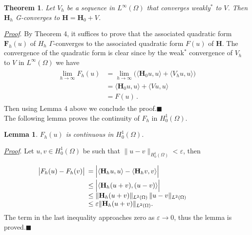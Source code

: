 \documentclass[11pt, epsf]{amsart}
\newtheorem{Theo}{Theorem}
\newtheorem{Lem}{Lemma}
\begin{document}
\begin{Theo}
\emph{
Let $V_h$ be a sequence in $L^\infty(\Omega)$ that converges weakly$^\ast$ to $V$. Then $\mathbf{H}_h$ G-converges to $\mathbf{H}=\mathbf{H}_0+V$.
}
\end{Theo}
\hspace{-4mm}\underline{\emph{Proof}}. By Theorem 4, it suffices to prove that the associated quadratic form $\mathbf{F}_h(u)$ of $H_h$ $\Gamma$-converges to the associated quadratic form $F(u)$ of $\mathbf{H}$. The convergence of the quadratic form is clear since by the weak$^\ast$ convergence of $V_h$ to $V$ in $L^\infty(\Omega)$ we have
\begin{eqnarray*}
\begin{array}{ll}
\displaystyle\lim_{h\to\infty}F_h(u)&\!\!\!=\displaystyle\lim_{h\to\infty} \Big(\langle \mathbf{H}_0u,u\rangle+\langle V_hu,u\rangle\Big)\\
&\!\!\!=\displaystyle\langle \mathbf{H}_0u,u\rangle+\langle Vu,u\rangle\\
&\!\!\!=F(u)\,.
\end{array}
\end{eqnarray*}
Then using Lemma 4 above we conclude the proof.\hfill{$\blacksquare$}\\

The following lemma proves the continuity of $F_h$ in $ H^1_0(\Omega)$.
\begin{Lem}
\emph{
$F_h(u)$ is continuous in $H^1_0(\Omega)$.
}
\end{Lem}
\hspace{-4mm}\underline{\emph{Proof}}. Let $u,v\in H^1_0(\Omega)$ be such that $\|u-v\|_{H^1_0(\Omega)}<\varepsilon$, then

\begin{eqnarray*}
\begin{array}{ll}
\vspace{1mm}
\hspace{-1.5cm}\big|F_h(u)-F_h(v)\big|\!\!\!&=\Big|\langle \mathbf{H}_hu,u\rangle - \langle \mathbf{H}_hv,v\rangle\Big|\\
&\leq\Big|\langle \mathbf{H}_h(u+v),(u-v)\rangle\Big|\\
&\leq\|\mathbf{H}_h(u+v)\|_{L^2(\Omega)}\,\|u-v\|_{L^2(\Omega)}\\
&\leq \varepsilon\|\mathbf{H}_h(u+v)\|_{L^2(\Omega)}.
\end{array}
\end{eqnarray*}
The term in the last inequality approaches zero as $\varepsilon\to0$, thus the lemma is proved.\hfill{$\blacksquare$}\\
\end{document}
